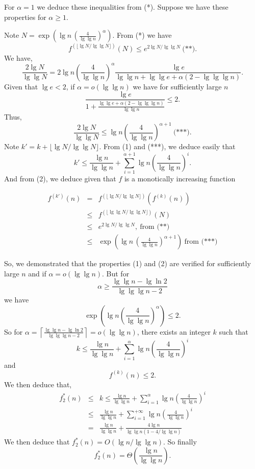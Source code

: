 \documentclass[a4paper,12pt]{article}
\begin{document}
\medskip
For $\alpha = 1$ we deduce these inequalities from (*).  Suppose we
have these properties for $\alpha \ge 1$.

Note $N = \exp\left(\lg n\, \left(\frac{4}{\lg\lg
  n}\right)^\alpha\right)$.  From (*) we have
\[ f^{(\lfloor \lg N/\lg\lg N\rfloor)}(N) \le
e^{2\lg N/\lg\lg N}\ \mbox{(**)}.\]
We have,
\[\frac{2\lg N}{\lg\lg N} =
2\lg n\left(\frac{4}{\lg\lg n}\right)^{\alpha} \frac{\lg e}{\lg\lg n
  +\lg\lg e + \alpha(2 - \lg\lg\lg n)}.\] Given that $\lg e < 2$, if
$\alpha = o(\lg\lg n)$ we have for sufficiently large $n$
\[\frac{\lg e}{1 + 
\frac{\lg\lg e + \alpha(2- \lg\lg\lg n)}{\lg\lg n}} \le 2.\]
Thus, 
\[\frac{2\lg N}{\lg\lg N} \le 
\lg n \left(\frac{4}{\lg\lg n}\right)^{\alpha+1}\ \mbox{(***)}.\] Note
$k' = k + \lfloor \lg N/\lg\lg N\rfloor$.  From (1) and (***), we
deduce easily that
\[ k' \le \frac{\lg n}{\lg\lg n} +
\sum_{i=1}^{\alpha+1} \lg n\left(\frac{4}{\lg\lg n}\right)^i.\]
And from (2), we deduce given that $f$ is a monotically
increasing function

\begin{eqnarray*}
f^{(k')}(n) &=& f^{(\lfloor \lg N/\lg\lg N\rfloor)}
\left(f^{(k)}(n)\right) \\
&\le& f^{(\lfloor \lg \lg N/\lg\lg N\rfloor)}(N) \\
&\le& e^{2\lg N/\lg\lg N},\ \mbox{from (**)} \\
&\le&\exp\left(\lg n\,
\left(\frac{4}{\lg\lg n}\right)^{\alpha+1}\right)\ \mbox{from (***)}
\end{eqnarray*}

\medskip
So, we demonstrated that the properties (1) and (2) are verified
for sufficiently large $n$ and if $\alpha = o(\lg\lg n)$.  But for 
\[ \alpha \ge \frac{\lg\lg n - \lg \ln 2}{\lg\lg\lg n - 2}\]
we have
\[ \exp\left(\lg n \left(\frac{4}{\lg\lg n}\right)^\alpha\right)
\le 2.\]
So for 
$\alpha = \left\lceil \frac{\lg\lg n - \lg \ln 2}{\lg\lg\lg n - 2}
\right\rceil = o(\lg\lg n)$, there exists an integer $k$ such that
\[ k \le \frac{\lg n}{\lg\lg n} +
\sum_{i=1}^\alpha \lg n\left(\frac{4}{\lg\lg n}\right)^i\]
and
\[ f^{(k)}(n) \le 2.\]
We then deduce that,
\begin{eqnarray*}
f^*_2(n) &\le& k \le \frac{\lg n}{\lg\lg n} +
\sum_{i=1}^\alpha \lg n\left(\frac{4}{\lg\lg n}\right)^i \\
&\le&\frac{\lg n}{\lg\lg n} +
\sum_{i=1}^{+\infty} \lg n\left(\frac{4}{\lg\lg n}\right)^i \\
&=&\frac{\lg n}{\lg\lg n} +
\frac{4\lg n}{\lg\lg n(1 - 4/\lg\lg n)}
\end{eqnarray*}
We then deduce that $f^*_2(n) = O(\lg n/\lg\lg n)$.  So finally
\[ f^*_2(n) = \Theta\left(\frac{\lg n}{\lg\lg n}\right).\]
\end{document}
